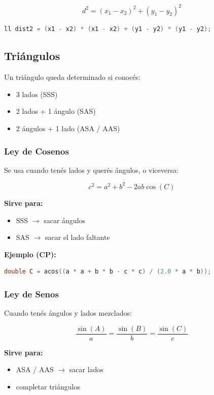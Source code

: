 \[
d^2 = (x_1-x_2)^2 + (y_1-y_2)^2
\]

\begin{lstlisting}[language=C++, caption={Distancia al cuadrado entre dos puntos}]
	ll dist2 = (x1 - x2) * (x1 - x2) + (y1 - y2) * (y1 - y2);
\end{lstlisting}

\subsection{Triángulos}
Un triángulo queda determinado si conocés:
\begin{itemize}
	\item 3 lados (SSS)
	\item 2 lados + 1 ángulo (SAS)
	\item 2 ángulos + 1 lado (ASA / AAS)
\end{itemize}

\subsubsection{Ley de Cosenos}
Se usa cuando tenés lados y querés ángulos, o viceversa:

\[
c^2 = a^2 + b^2 - 2ab\cos(C)
\]

\textbf{Sirve para:}
\begin{itemize}
	\item SSS \(\to\) sacar ángulos
	\item SAS \(\to\) sacar el lado faltante
\end{itemize}

\textbf{Ejemplo (CP):}
\begin{lstlisting}[language=C++, caption={Ley de Cosenos: obtener un ángulo}]
	double C = acos((a * a + b * b - c * c) / (2.0 * a * b));
\end{lstlisting}

\subsubsection{Ley de Senos}
Cuando tenés ángulos y lados mezclados:

\[
\frac{\sin(A)}{a} = \frac{\sin(B)}{b} = \frac{\sin(C)}{c}
\]

\textbf{Sirve para:}
\begin{itemize}
	\item ASA / AAS \(\to\) sacar lados
	\item completar triángulos
\end{itemize}

